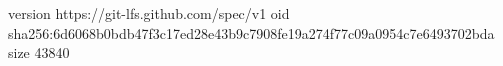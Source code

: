version https://git-lfs.github.com/spec/v1
oid sha256:6d6068b0bdb47f3c17ed28e43b9c7908fe19a274f77c09a0954c7e6493702bda
size 43840
